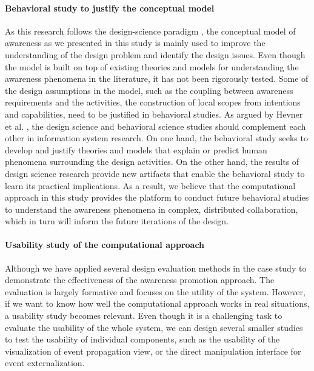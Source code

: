 \paragraph*{Behavioral study to justify the conceptual model} %
\label{par:behavioral_study_to_understand_the_conceptual_model}
As this research follows the design-science paradigm \cite{Hevner2004}, the conceptual model of awareness as we presented in this study is mainly used to improve the understanding of the design problem and identify the design issues. Even though the model is built on top of existing theories and models for understanding the awareness phenomena in the literature, it has not been rigorously tested. Some of the design assumptions in the model, such as the coupling between awareness requirements and the activities, the construction of local scopes from intentions and capabilities, need to be justified in behavioral studies. As argued by Hevner et al. \cite{Hevner2004}, the design science and behavioral science studies should complement each other in information system research. On one hand, the behavioral study seeks to develop and justify theories and models that explain or predict human phenomena surrounding the design activities. On the other hand, the results of design science research provide new artifacts that enable the behavioral study to learn its practical implications. As a result, we believe that the computational approach in this study provides the platform to conduct future behavioral studies to understand the awareness phenomena in complex, distributed collaboration, which in turn will inform the future iterations of the design. 

\paragraph*{Usability study of the computational approach} %
\label{par:usability_study_of_the_prototype_system}
Although we have applied several design evaluation methods in the case study to demonstrate the effectiveness of the awareness promotion approach. The evaluation is largely formative and focuses on the utility of the system. However, if we want to know how well the computational approach works in real situations, a usability study becomes relevant. Even though it is a challenging task to evaluate the usability of the whole system, we can design several smaller studies to test the usability of individual components, such as the usability of the visualization of event propagation view, or the direct manipulation interface for event externalization.

